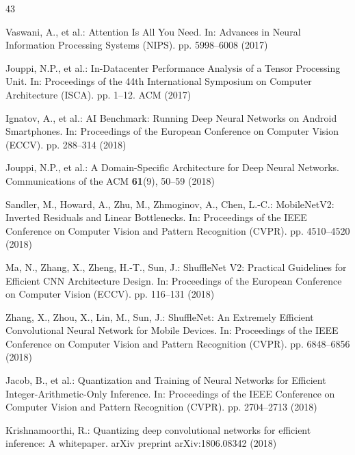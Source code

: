 \documentclass[conference]{IEEEtran}
\begin{document}
\begin{thebibliography}{43}

Vaswani, A., et al.: Attention Is All You Need. In: Advances in Neural Information Processing Systems (NIPS). pp. 5998--6008 (2017)


Jouppi, N.P., et al.: In-Datacenter Performance Analysis of a Tensor Processing Unit. In: Proceedings of the 44th International Symposium on Computer Architecture (ISCA). pp. 1--12. ACM (2017)


Ignatov, A., et al.: AI Benchmark: Running Deep Neural Networks on Android Smartphones. In: Proceedings of the European Conference on Computer Vision (ECCV). pp. 288--314 (2018)


Jouppi, N.P., et al.: A Domain-Specific Architecture for Deep Neural Networks. Communications of the ACM \textbf{61}(9), 50--59 (2018)


Sandler, M., Howard, A., Zhu, M., Zhmoginov, A., Chen, L.-C.: MobileNetV2: Inverted Residuals and Linear Bottlenecks. In: Proceedings of the IEEE Conference on Computer Vision and Pattern Recognition (CVPR). pp. 4510--4520 (2018)


Ma, N., Zhang, X., Zheng, H.-T., Sun, J.: ShuffleNet V2: Practical Guidelines for Efficient CNN Architecture Design. In: Proceedings of the European Conference on Computer Vision (ECCV). pp. 116--131 (2018)


Zhang, X., Zhou, X., Lin, M., Sun, J.: ShuffleNet: An Extremely Efficient Convolutional Neural Network for Mobile Devices. In: Proceedings of the IEEE Conference on Computer Vision and Pattern Recognition (CVPR). pp. 6848--6856 (2018)


Jacob, B., et al.: Quantization and Training of Neural Networks for Efficient Integer-Arithmetic-Only Inference. In: Proceedings of the IEEE Conference on Computer Vision and Pattern Recognition (CVPR). pp. 2704--2713 (2018)


Krishnamoorthi, R.: Quantizing deep convolutional networks for efficient inference: A whitepaper. arXiv preprint arXiv:1806.08342 (2018)


\end{thebibliography}
\end{document}
